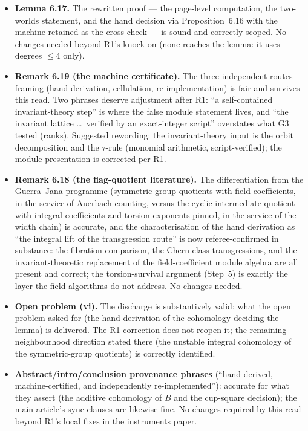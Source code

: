 \documentclass[11pt,a4paper]{article}
\begin{document}
\begin{itemize}[leftmargin=1.4em,itemsep=3pt]
\item \textbf{Lemma 6.17.} The rewritten proof --- the page-level computation,
the two-worlds statement, and the hand decision via Proposition~6.16 with the
machine retained as the cross-check --- is sound and correctly scoped. No
changes needed beyond R1's knock-on (none reaches the lemma: it uses degrees
$\le4$ only).
\item \textbf{Remark 6.19 (the machine certificate).} The
three-independent-routes framing (hand derivation, cellulation,
re-implementation) is fair and survives this read. Two phrases deserve
adjustment after R1: ``a self-contained invariant-theory step'' is where the
false module statement lives, and ``the invariant lattice \dots\ verified by
an exact-integer script'' overstates what G3 tested (ranks). Suggested
rewording: the invariant-theory input is the orbit decomposition and the
$\tau$-rule (monomial arithmetic, script-verified); the module presentation
is corrected per R1.
\item \textbf{Remark 6.18 (the flag-quotient literature).} The
differentiation from the Guerra--Jana programme (symmetric-group quotients
with field coefficients, in the service of Auerbach counting, versus the
cyclic intermediate quotient with integral coefficients and torsion
exponents pinned, in the service of the width chain) is accurate, and the
characterisation of the hand derivation as ``the integral lift of the
transgression route'' is now referee-confirmed in substance: the fibration
comparison, the Chern-class transgressions, and the invariant-theoretic
replacement of the field-coefficient module algebra are all present and
correct; the torsion-survival argument (Step~5) is exactly the layer the
field algorithms do not address. No changes needed.
\item \textbf{Open problem (vi).} The discharge is substantively valid: what
the open problem asked for (the hand derivation of the cohomology deciding
the lemma) is delivered. The R1 correction does not reopen it; the remaining
neighbourhood direction stated there (the unstable integral cohomology of
the symmetric-group quotients) is correctly identified.
\item \textbf{Abstract/intro/conclusion provenance phrases}
(``hand-derived, machine-certified, and independently re-implemented''):
accurate for what they assert (the additive cohomology of $B$ and the
cup-square decision); the main article's sync clauses are likewise fine. No
changes required by this read beyond R1's local fixes in the instruments
paper.
\end{itemize}
\end{document}
